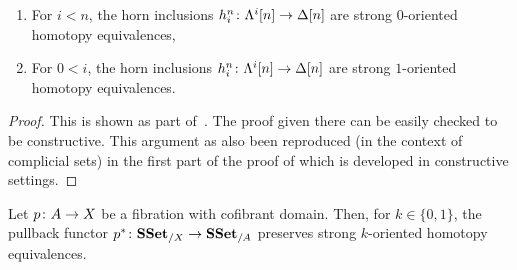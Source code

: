 \documentclass[reqno,10pt,a4paper,oneside,draft]{amsart}
\begin{document}
\begin{lemma}\label{lemma:genTcof_strongHequiv} \hfill 
\begin{enumerate}[$(i)$]
\item For $i < n$, the horn inclusions $h^n_i \colon \Lambda^i[n] \rightarrow \Delta[n]$ are strong $0$-oriented homotopy equivalences,
\item For $0 < i $, the horn inclusions $h^n_i \colon \Lambda^i[n] \rightarrow \Delta[n]$ are strong $1$-oriented homotopy equivalences.
\end{enumerate}
\end{lemma}

\begin{proof}
This is shown as part of~\cite[Theorem 3.2.3]{joyal-tierney:simplicial-homotopy-theory}. The proof given there can be easily checked to be constructive. This argument as also been reproduced (in the context of complicial sets) in the first part of the proof of \cite[Proposition~5.2.6]{henry2018wms} which is developed in constructive settings.
\end{proof}




\begin{lemma} 
\label{lemma:pb_of_StrongHomotopyEq}
Let $p \colon A \rightarrow X$ be a fibration with cofibrant domain. Then, for $k \in \{0,1\}$, 
the pullback functor $p^* \colon \mathbf{SSet}_{/X} \to \mathbf{SSet}_{/A}$ preserves strong $k$-oriented homotopy equivalences.
\end{lemma}
\end{document}
